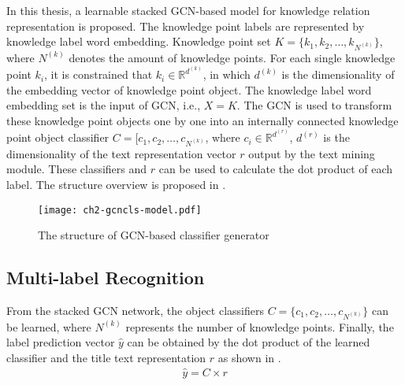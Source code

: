 In this thesis, a learnable stacked GCN-based model for knowledge relation representation is proposed. The knowledge point labels are represented by knowledge label word embedding. Knowledge point set \(K=\{k_1,k_2,\ldots,k_{N^{(k)}}\} \), where \(N^{(k)}\) denotes the amount of knowledge points. For each single knowledge point \(k_i\), it is constrained that \(k_i \in \mathbb{R}^ {d^{(k)}}\), in which \(d^{(k)}\) is the dimensionality of the embedding vector of knowledge point object. The knowledge label word embedding set is the input of GCN, i.e., \(X = K\). The GCN is used to transform these knowledge point objects one by one into an internally connected knowledge point object classifier \(C=[c_1,c_2,\ldots,c_{N^{(k)}}\), where \(c_i \in \mathbb {R}^{d^{(r)}}\), \(d^{(r)}\) is the dimensionality of the text representation vector \(r\) output by the text mining module. These classifiers and \(r\) can be used to calculate the dot product of each label. The structure overview is proposed in \figname{\ref{fig:ch2-gcn-clsgen}}.

\begin{figure}[htbp!]
    \centering
    \texttt{[image: ch2-gcncls-model.pdf]}
    \caption{The structure of GCN-based classifier generator}\label{fig:ch2-gcn-clsgen}
\end{figure}

\subsection{Multi-label Recognition}

From the stacked GCN network, the object classifiers \(C=\{c_1,c_2,\ldots,c_{N^{(k)}}\} \) can be learned, where \(N^{(k)}\) represents the number of knowledge points. Finally, the label prediction vector \(\hat{y}\) can be obtained by the dot product of the learned classifier and the title text representation \(r\) as shown in \eqname{\ref{fml:ch2-classifier-mul}}.
\begin{align}\label{fml:ch2-classifier-mul}
    \hat{y} = C\times r
\end{align}

